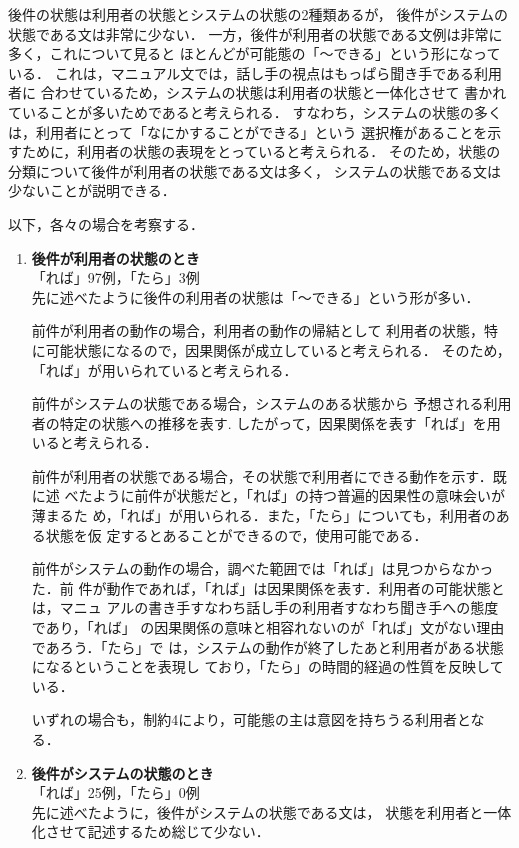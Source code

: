 後件の状態は利用者の状態とシステムの状態の2種類あるが，
後件がシステムの状態である文は非常に少ない．
一方，後件が利用者の状態である文例は非常に多く，これについて見ると
ほとんどが可能態の「〜できる」という形になっている．
これは，マニュアル文では，話し手の視点はもっぱら聞き手である利用者に
合わせているため，システムの状態は利用者の状態と一体化させて
書かれていることが多いためであると考えられる．
すなわち，システムの状態の多くは，利用者にとって「なにかすることができる」という
選択権があることを示すために，利用者の状態の表現をとっていると考えられる．
そのため，状態の分類について後件が利用者の状態である文は多く，
システムの状態である文は少ないことが説明できる．

以下，各々の場合を考察する．
\def\labelenumi{}
\def\theenumi{}
\begin{enumerate}
\item {\bf 後件が利用者の状態のとき}\label{-usrst}\\
「れば」97例，「たら」3例\\
先に述べたように後件の利用者の状態は「〜できる」という形が多い．

前件が利用者の動作の場合，利用者の動作の帰結として
利用者の状態，特に可能状態になるので，因果関係が成立していると考えられる．
そのため，「れば」が用いられていると考えられる．

前件がシステムの状態である場合，システムのある状態から
予想される利用者の特定の状態への推移を表す.
したがって，因果関係を表す「れば」を用いると考えられる．

前件が利用者の状態である場合，その状態で利用者にできる動作を示す．既に述
べたように前件が状態だと，「れば」の持つ普遍的因果性の意味会いが薄まるた
め，「れば」が用いられる．また，「たら」についても，利用者のある状態を仮
定するとあることができるので，使用可能である．

前件がシステムの動作の場合，調べた範囲では「れば」は見つからなかった．前
件が動作であれば，「れば」は因果関係を表す．利用者の可能状態とは，マニュ
アルの書き手すなわち話し手の利用者すなわち聞き手への態度であり，「れば」
の因果関係の意味と相容れないのが「れば」文がない理由であろう．「たら」で
は，システムの動作が終了したあと利用者がある状態になるということを表現し
ており，「たら」の時間的経過の性質を反映している．

いずれの場合も，制約4により，可能態の{\dg 主}は意図を持ちうる利用者となる．

\item {\bf 後件がシステムの状態のとき}\label{-sysst}\\
「れば」25例，「たら」0例\\
先に述べたように，後件がシステムの状態である文は，
状態を利用者と一体化させて記述するため総じて少ない．


\end{enumerate}
